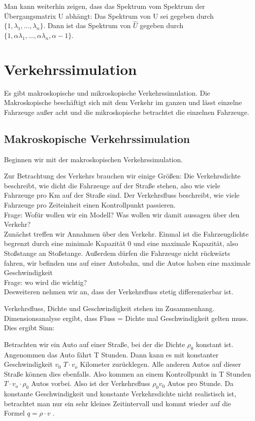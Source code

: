 \documentclass[]{article}
\begin{document}
Man kann weiterhin zeigen, dass das Spektrum vom Spektrum der Übergangsmatrix U abhängt: Das Spektrum von U sei gegeben durch $\{1, \lambda_1 ,\dots, \lambda_n \}$. Dann ist das Spektrum von $\hat{U}$ gegeben durch $\{1, \alpha \lambda_1, \dots , \alpha \lambda_n, \alpha -1\}$. 


\section{Verkehrssimulation}
Es gibt makroskopische und mikroskopische Verkehrssimulation. Die Makroskopische beschäftigt sich mit dem Verkehr im ganzen und lässt einzelne Fahrzeuge außer acht und die mikroskopische betrachtet die einzelnen Fahrzeuge. 

\subsection{Makroskopische Verkehrssimulation}

Beginnen wir mit der makroskopischen Verkehrssimulation. 

Zur Betrachtung des Verkehrs brauchen wir einige Größen: Die Verkehrsdichte beschreibt, wie dicht die Fahrzeuge auf der Straße stehen, also wie viele Fahrzeuge pro Km auf der Straße sind. Der Verkehrsfluss beschreibt, wie viele Fahrzeuge pro Zeiteinheit einen Kontrollpunkt passieren. \\

Frage: Wofür wollen wir ein Modell?  Was wollen wir damit aussagen über den Verkehr? \\

Zunächst treffen wir Annahmen über den Verkehr. Einmal ist die Fahrzeugdichte begrenzt durch eine minimale Kapazität 0 und eine maximale Kapazität, also Stoßstange an Stoßstange. Außerdem dürfen die Fahrzeuge nicht rückwärts fahren, wir befinden uns auf einer Autobahn, und die Autos haben eine maximale Geschwindigkeit \\

Frage: wo wird die wichtig? \\

Desweiteren nehmen wir an, dass der Verkehrsfluss stetig differenzierbar ist.

Verkehrsfluss, Dichte und Geschwindigkeit stehen im Zusammenhang. Dimensionsanalyse ergibt, dass Fluss = Dichte mal Geschwindigkeit gelten muss. Dies ergibt Sinn: 

Betrachten wir ein Auto auf einer Straße, bei der die Dichte $\rho_0$ konstant ist. Angenommen das Auto fährt T Stunden. Dann kann es mit konstanter Geschwindigkeit $v_0$ $T \cdot v_o$ Kilometer zurücklegen. Alle anderen Autos auf dieser Straße können dies ebenfalls. Also kommen an einem Kontrollpunkt in T Stunden $T \cdot v_o \cdot \rho_0$ Autos vorbei. Also ist der Verkehrsfluss $\rho_0 v_0$ Autos pro Stunde.  Da konstante Geschwindigkeit und konstante Verkehrsdichte nicht realistisch ist, betrachtet man nur ein sehr kleines Zeitintervall und kommt wieder auf die Formel $q= \rho \cdot v$ .   
\end{document}
